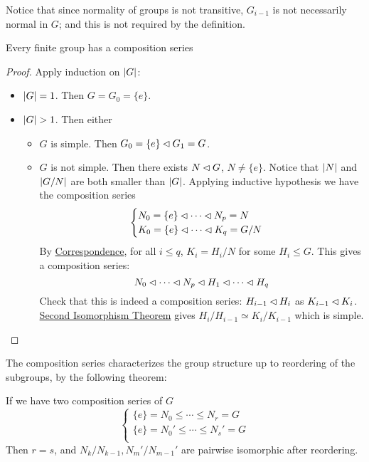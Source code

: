 \begin{remark}
    Notice that since normality of groups is not transitive, $G_{i-1}$ is not necessarily normal in $G$; and this is not required by the definition.
\end{remark}

\begin{proposition}
    Every finite group has a composition series
\end{proposition}

\begin{proof}
    Apply induction on $\left|G\right|$:
    \begin{itemize}
        \item $\left|G\right| = 1$. Then $G = G_0 = \{e\}$. 
        \item $\left|G\right| > 1$. Then either
        \begin{itemize}
            \item $G$ is simple. Then $G_0 = \{e\} \lhd G_1 = G$.
            \item $G$ is not simple. Then there exists $N \lhd G$, $N \neq \{e\}$. Notice that $\left|N\right|$ and $\left|G/N\right|$ are both smaller than $\left|G\right|$. Applying inductive hypothesis we have the composition series
            \[
                \begin{cases}
                    N_0 = \{e\} \lhd \cdots \lhd N_p = N \\
                    K_0 = \{e\} \lhd \cdots \lhd K_q = G/N
                \end{cases}
            \]
            By \hyperref[thm: correspondence]{Correspondence}, for all $i \leq q$, $K_i = H_i/N$ for some $H_i \leq G$. This gives a composition series:
            \[
                N_0 \lhd \cdots \lhd N_p \lhd H_1 \lhd \cdots \lhd H_q
            \]
            Check that this is indeed a composition series: $H_{i-1} \lhd H_i$ as $K_{i-1} \lhd K_i$. \hyperref[thm: second isomorphism theorem]{Second Isomorphism Theorem} gives $H_i/H_{i-1} \simeq K_i/K_{i-1}$ which is simple.
        \end{itemize}
    \end{itemize}
\end{proof}

\textstart
The composition series characterizes the group structure up to reordering of the subgroups, by the following theorem:

\begin{theorem}
    If we have two composition series of $G$
    \[
        \begin{cases}
            \{e\} = N_0 \leq \cdots \leq N_r = G \\
            \{e\} = N_0' \leq \cdots \leq N_s' = G \\
        \end{cases}
    \]
    Then $r = s$, and $N_k/N_{k-1}, N_m'/N_{m-1}'$ are pairwise isomorphic after reordering.
\end{theorem}

